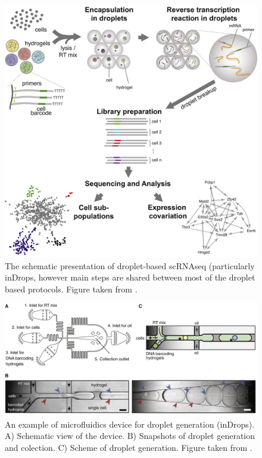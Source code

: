 \begin{figure}
  \centering
  \includegraphics[width=\linewidth]{images/scAnalysisPipeline.jpg}
  \caption{The schematic presentation of droplet-based scRNAseq
  (particularly inDrops, however main steps are shared between most of the droplet based protocols.
  Figure taken from \textcite{Klein2015}.}
  \label{fig:inDropsPipeline}
\end{figure}

\begin{figure}
  \centering
  \includegraphics[width=\linewidth]{images/indropsDevice.jpg}
  \caption{An example of microfluidics device for droplet generation (inDrops).
  A) Schematic view of the device.
  B) Snapshots of droplet generation and colection.
  C) Scheme of droplet generation.
  Figure taken from \textcite{Klein2015}.}
  \label{fig:inDropsDevice}
\end{figure}


